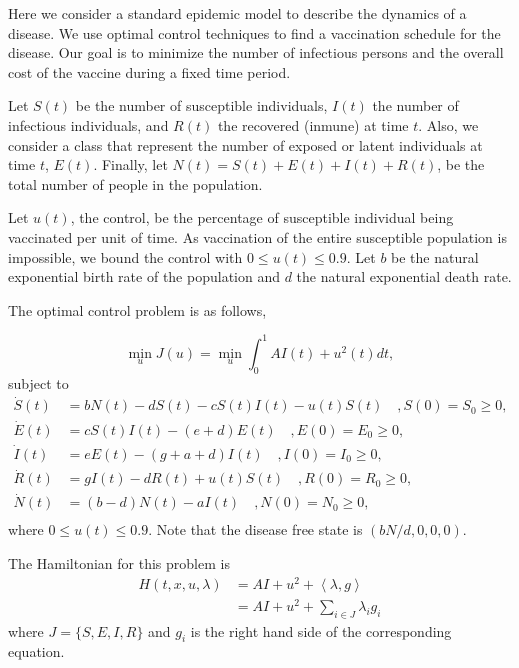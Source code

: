 Here we consider a standard epidemic model to describe the dynamics of a 
disease. We use optimal control techniques to find a vaccination
schedule for the disease. Our goal is to minimize the number of infectious 
persons and the overall cost of the vaccine during a fixed time period. 

Let $S(t)$ be the number of susceptible individuals, $I(t)$ the
number of infectious individuals, and $R(t)$ the recovered (inmune)  at time
$t$. Also, we consider a class that represent the number of exposed or latent
individuals at time $t$, $E(t)$. 
Finally, let $N(t) = S(t) + E(t) + I(t) + R (t)$,
be the total number of people in the population.

Let $u(t)$, the control, be the percentage of susceptible individual being 
vaccinated per unit of time. As vaccination of the entire susceptible population
is impossible, we bound the control with $0 \leq u(t) \leq 0.9$. Let $b$ be the
natural exponential birth rate of the population and $d$ the natural exponential
death rate. 

The optimal control problem is as follows,

$$
    \min_{u} J(u) = \min_{u} \int_{0}^{1} AI(t) + u^{2}(t) dt,
$$
subject to
\begin{align*}
    \dot{S}(t) &=
        bN(t) - dS(t) - cS(t)I(t) - u(t)S(t) \quad, S(0) = S_0 \geq 0,   \\
    \dot{E}(t) &=
        cS(t)I(t) - (e + d)E(t) \quad, E(0) = E_0 \geq 0,    \\
    \dot{I}(t) &=
        eE(t) - (g + a +d)I(t) \quad, I(0) = I_0 \geq 0,     \\
    \dot{R}(t) &=
        gI(t) -dR(t) + u(t)S(t) \quad, R(0) = R_0 \geq 0,    \\
    \dot{N}(t) &=
        (b - d)N(t) - aI(t) \quad, N(0) = N_0 \geq 0,        \\
\end{align*}
where $0 \leq u(t) \leq 0.9$. Note that the disease free state is 
$(bN/d,0,0,0)$.

The Hamiltonian for this problem is
\begin{align*}
    H(t,x,u,\lambda) &= AI + u^{2} + \left< \lambda , g \right> \\
                     &= AI + u^{2} + \sum_{i \in J} \lambda_{i}g_{i}
\end{align*}
where $J = \{S, E, I, R\}$ and $g_i$ is the right hand side of the corresponding
equation.

